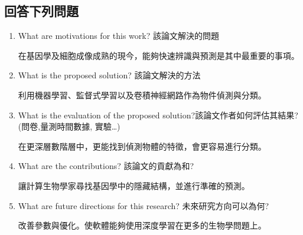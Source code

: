 \subsection{回答下列問題}

\begin{enumerate}
\item  What are motivations for this work? 該論文解決的問題  

在基因學及細胞成像成熟的現今，能夠快速辨識與預測是其中最重要的事項。

\item  What is the proposed solution? 該論文解決的方法

利用機器學習、監督式學習以及卷積神經網路作為物件偵測與分類。

\item  What is the evaluation of the proposed solution?該論文作者如何評估其結果? (問卷,量測時間數據, 實驗…)

在更深層數階層中，更能找到偵測物體的特徵，會更容易進行分類。

\item  What are the contributions? 該論文的貢獻為和?

讓計算生物學家尋找基因學中的隱藏結構，並進行準確的預測。

\item  What are future directions for this research? 未來研究方向可以為何?

改善參數與優化。使軟體能夠使用深度學習在更多的生物學問題上。

\end{enumerate}